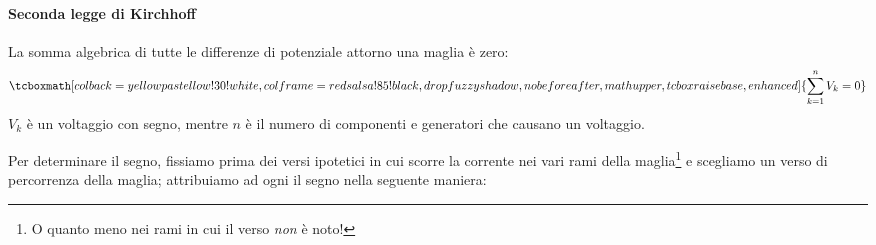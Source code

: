 \paragraph{Seconda legge di Kirchhoff}
\begin{theoremaqed}
	La somma algebrica di tutte le differenze di potenziale attorno una maglia è zero:
	\begin{equation}
		\tcboxmath[colback=yellowpastellow!30!white,colframe=redsalsa!85!black,drop fuzzy shadow, nobeforeafter, math upper, tcbox raise base, enhanced]{\sum_{k=1}^nV_k=0}
	\end{equation}
	$V_k$ è un voltaggio con segno, mentre $n$ è il numero di componenti e generatori che causano un voltaggio.
\end{theoremaqed}
 Per determinare il segno, fissiamo prima dei versi ipotetici in cui scorre la corrente nei vari rami della maglia\footnote{O quanto meno nei rami in cui il verso \textit{non} è noto!} e scegliamo un verso di percorrenza della maglia; attribuiamo ad ogni \ddp il segno nella seguente maniera:
